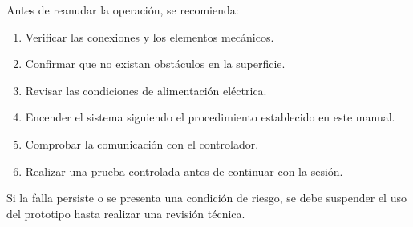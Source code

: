 \documentclass[letterpaper,journal]{IEEEtran}
\begin{document}
Antes de reanudar la operación,
se recomienda:

\begin{enumerate}
    \item Verificar las conexiones
    y los elementos mecánicos.

    \item Confirmar que no existan
    obstáculos en la superficie.

    \item Revisar las condiciones
    de alimentación eléctrica.

    \item Encender el sistema
    siguiendo el procedimiento
    establecido en este manual.

    \item Comprobar la comunicación
    con el controlador.

    \item Realizar una prueba
    controlada antes de continuar
    con la sesión.
\end{enumerate}

Si la falla persiste o se presenta
una condición de riesgo, se debe
suspender el uso del prototipo
hasta realizar una revisión técnica.
\end{document}
